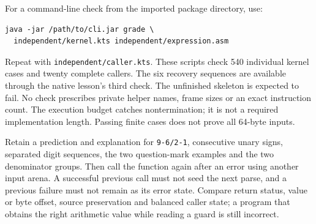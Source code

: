For a command-line check from the imported package directory, use:
\begin{verbatim}
java -jar /path/to/cli.jar grade \
  independent/kernel.kts independent/expression.asm
\end{verbatim}
Repeat with \texttt{independent/caller.kts}. These scripts check 540 individual
kernel cases and twenty complete callers. The six recovery sequences are
available through the native lesson's third check. The unfinished skeleton is
expected to fail. No check prescribes private helper names, frame sizes or an
exact instruction count. The execution budget catches nontermination; it is
not a required implementation length. Passing finite cases does not prove all
64-byte inputs.

Retain a prediction and explanation for \texttt{9-6/2-1}, consecutive unary
signs, separated digit sequences, the two question-mark examples and the two
denominator groups. Then call the function again after an error using another
input arena. A successful previous call must not seed the next parse, and a
previous failure must not remain as its error state. Compare return status,
value or byte offset, source preservation and balanced caller state; a program
that obtains the right arithmetic value while reading a guard is still incorrect.
